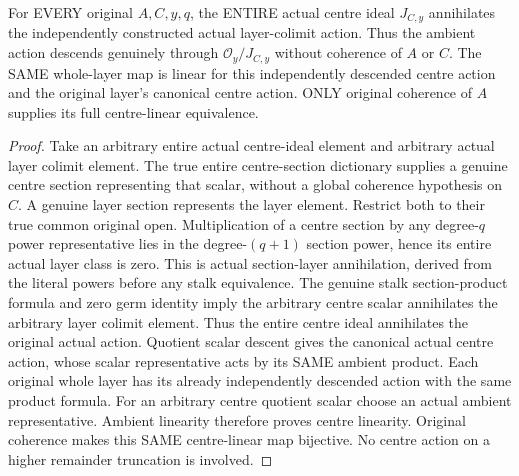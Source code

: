 \begin{theorem}
\label{hir:real-domain-actual-normal-layer-colimit-centre-scalars}
\leanok
For EVERY original $A,C,y,q$, the ENTIRE actual centre ideal $J_{C,y}$
annihilates the independently constructed actual layer-colimit action.
Thus the ambient action descends genuinely through $\mathcal O_y/J_{C,y}$
without coherence of $A$ or $C$. The SAME whole-layer map is linear for
this independently descended centre action and the original layer's
canonical centre action. ONLY original coherence of $A$ supplies its
full centre-linear equivalence.
\end{theorem}
\begin{proof}
Take an arbitrary entire actual centre-ideal element and arbitrary actual
layer colimit element. The true entire centre-section dictionary supplies
a genuine centre section representing that scalar, without a global
coherence hypothesis on $C$. A genuine layer section represents the layer
element. Restrict both to their true common original open. Multiplication
of a centre section by any degree-$q$ power representative lies in the
degree-$(q+1)$ section power, hence its entire actual layer class is zero.
This is actual section-layer annihilation, derived from the literal
powers before any stalk equivalence. The genuine stalk section-product
formula and zero germ identity imply the arbitrary centre scalar
annihilates the arbitrary layer colimit element. Thus the entire centre
ideal annihilates the original actual action. Quotient scalar descent
gives the canonical actual centre action, whose scalar representative
acts by its SAME ambient product. Each original whole layer has its
already independently descended action with the same product formula.
For an arbitrary centre quotient scalar choose an actual ambient
representative. Ambient linearity therefore proves centre linearity.
Original coherence makes this SAME centre-linear map bijective.
No centre action on a higher remainder truncation is involved.
\end{proof}

